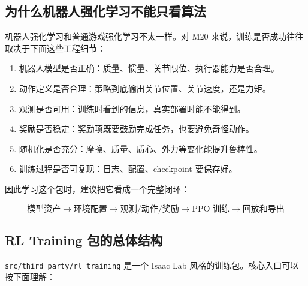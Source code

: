 \documentclass[UTF8,11pt,a4paper]{ctexart}
\begin{document}
\subsection{为什么机器人强化学习不能只看算法}

机器人强化学习和普通游戏强化学习不太一样。对 M20 来说，训练是否成功往往取决于下面这些工程细节：

\begin{enumerate}
  \item 机器人模型是否正确：质量、惯量、关节限位、执行器能力是否合理。
  \item 动作定义是否合理：策略到底输出关节位置、关节速度，还是力矩。
  \item 观测是否可用：训练时看到的信息，真实部署时能不能得到。
  \item 奖励是否稳定：奖励项既要鼓励完成任务，也要避免奇怪动作。
  \item 随机化是否充分：摩擦、质量、质心、外力等变化能提升鲁棒性。
  \item 训练过程是否可复现：日志、配置、checkpoint 要保存好。
\end{enumerate}

因此学习这个包时，建议把它看成一个完整闭环：

\[
\boxed{
\text{模型资产}
\rightarrow
\text{环境配置}
\rightarrow
\text{观测/动作/奖励}
\rightarrow
\text{PPO 训练}
\rightarrow
\text{回放和导出}
}
\]

\subsection{RL Training 包的总体结构}

\texttt{src/third\_party/rl\_training} 是一个 Isaac Lab 风格的训练包。核心入口可以按下面理解：
\end{document}
